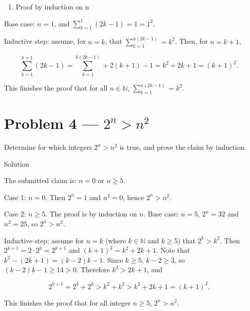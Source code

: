 \begin{qlsolution}{\begin{enumerate}
\def\labelenumi{(\alph{enumi})}
\setcounter{enumi}{1}
\tightlist
\item
  Proof by induction on n
\end{enumerate}}

Base case: \(n = 1\), and \(\sum_{k = 1}^{1}\left( {2k - 1} \right) = 1 = 1^{2}\).

Inductive step: assume, for \(n = k\), that \(\sum_{k = 1}^{n{({2k - 1})}} = k^{2}\). Then, for \(n = k + 1\),

\[\sum\limits_{k = 1}^{k + 1}\left( {2k - 1} \right) = \sum\limits_{k = 1}^{k{({2k - 1})}} + 2\left( {k + 1} \right) - 1 = k^{2} + 2k + 1 = \left( {k + 1} \right)^{2}.\]

This finishes the proof that for all \(n \in \mathbb{N}\), \(\sum_{k = 1}^{n{({2k - 1})}} = k^{2}\).

\end{qlsolution}

\section{\texorpdfstring{Problem 4 --- \(2^{n} > n^{2}\)}{Problem 4 --- 2\^{}\{n\} \textgreater{} n\^{}\{2\}}}

Determine for which integers \(2^{n} > n^{2}\) is true, and prove the claim by induction.

\begin{qlsolution}{Solution}

The submitted claim is: \(n = 0\) or \(n \geq 5\).

Case 1: \(n = 0\). Then \(2^{n} = 1\) and \(n^{2} = 0\), hence \(2^{n} > n^{2}\).

Case 2: \(n \geq 5\). The proof is by induction on \(n\). Base case: \(n = 5\), \(2^{n} = 32\) and \(n^{2} = 25\), so \(2^{n} > n^{2}\).

Inductive step: assume for \(n = k\) (where \(k \in \mathbb{N}\) and \(k \geq 5\)) that \(2^{k} > k^{2}\). Then \(2^{k + 1} = 2 \cdot 2^{k} = 2^{k + 1}\) and \(\left( {k + 1} \right)^{2} = k^{2} + 2k + 1\). Note that \(k^{2} - \left( {2k + 1} \right) = \left( {k - 2} \right)k - 1\). Since \(k \geq 5\), \(k - 2 \geq 3\), so \(\left( {k - 2} \right)k - 1 \geq 14 > 0\). Therefore \(k^{2} > 2k + 1\), and

\[2^{k + 1} = 2^{k} + 2^{k} > k^{2} + k^{2} > k^{2} + 2k + 1 = \left( {k + 1} \right)^{2}.\]

This finishes the proof that for all integer \(n \geq 5\), \(2^{n} > n^{2}\).

\end{qlsolution}

